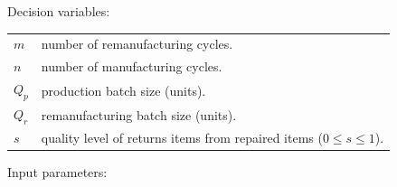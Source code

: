 \documentclass[11pt]{article}
\begin{document}
\noindent Decision variables:
\begin{table} [H]
\begin{tabular}{l l}
$m$& number of remanufacturing cycles.\\
$n$& number of manufacturing cycles.\\
$Q_p$& production batch size (units).\\
$Q_r$& remanufacturing batch size (units).\\
$s$  & quality level of returns items from repaired items ($0\leq s \leq 1$). \\

\end{tabular}
\end{table}\newpage
\noindent Input parameters:
\end{document}
